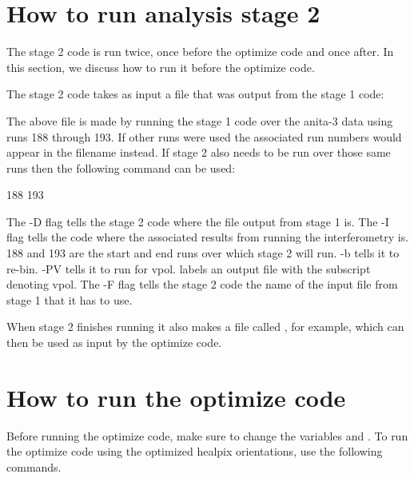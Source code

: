 \section{How to run analysis stage 2}

The stage 2 code is run twice, once before the optimize code and once after. In this section, we discuss how to run it before the optimize code. 

The stage 2 code takes as input a file that was output from the stage 1 code:

\begin{center}
\end{center}

The above file is made by running the stage 1 code over the \gls{anita}-3 data using runs 188 through 193. If other runs were used the associated run numbers would appear in the filename instead. If stage 2 also needs to be run over those same runs then the following command can be used:

\begin{center}
   188 193    
\end{center}

The -D flag tells the stage 2 code where the file output from stage 1 is. The -I flag tells the code where the associated results from running the interferometry is. 188 and 193 are the start and end runs over which stage 2 will run. -b tells it to re-bin. -PV tells it to run for \gls{vpol}.  labels an output file with the subscript  denoting \gls{vpol}. The -F flag tells the stage 2 code the name of the input file from stage 1 that it has to use.

When stage 2 finishes running it also makes a file called , for example, which can then be used as input by the optimize code. 

\section{How to run the optimize code}

Before running the optimize code, make sure to change the variables  and . To run the optimize code using the optimized healpix orientations, use the following commands. 

